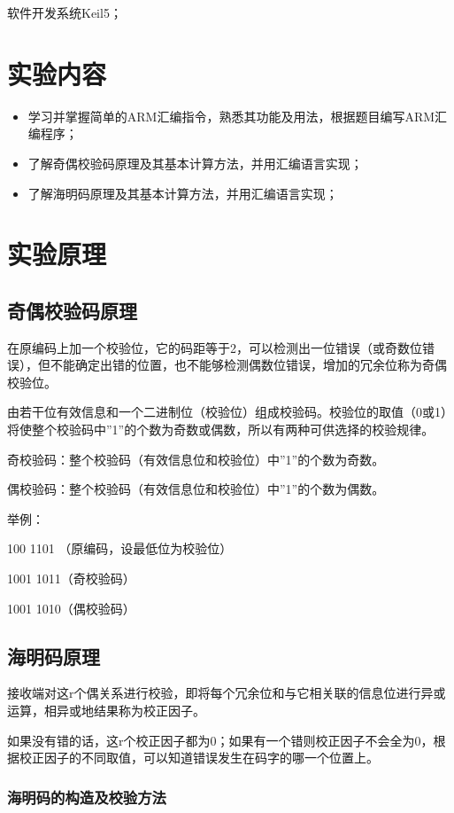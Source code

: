\documentclass[a4paper,10pt,UTF8]{paper}
\numberwithin{equation}{section}
\numberwithin{figure}{section}
\begin{document}
软件开发系统Keil5；

\section{实验内容}

\begin{itemize}
  \item 学习并掌握简单的ARM汇编指令，熟悉其功能及用法，根据题目编写ARM汇编程序；
  \item 了解奇偶校验码原理及其基本计算方法，并用汇编语言实现；
  \item 了解海明码原理及其基本计算方法，并用汇编语言实现；
\end{itemize}

\section{实验原理}

\subsection{奇偶校验码原理}

在原编码上加一个校验位，它的码距等于2，可以检测出一位错误（或奇数位错误），但不能确定出错的位置，也不能够检测偶数位错误，增加的冗余位称为奇偶校验位。

由若干位有效信息和一个二进制位（校验位）组成校验码。校验位的取值（0或1）将使整个校验码中”1”的个数为奇数或偶数，所以有两种可供选择的校验规律。

奇校验码：整个校验码（有效信息位和校验位）中''1''的个数为奇数。

偶校验码：整个校验码（有效信息位和校验位）中''1''的个数为偶数。

举例：

100 1101 （原编码，设最低位为校验位）

1001 1011（奇校验码）

1001 1010（偶校验码）

\subsection{海明码原理}

接收端对这r个偶关系进行校验，即将每个冗余位和与它相关联的信息位进行异或运算，相异或地结果称为校正因子。

如果没有错的话，这r个校正因子都为0；如果有一个错则校正因子不会全为0，根据校正因子的不同取值，可以知道错误发生在码字的哪一个位置上。

\subsubsection{海明码的构造及校验方法}
\end{document}
